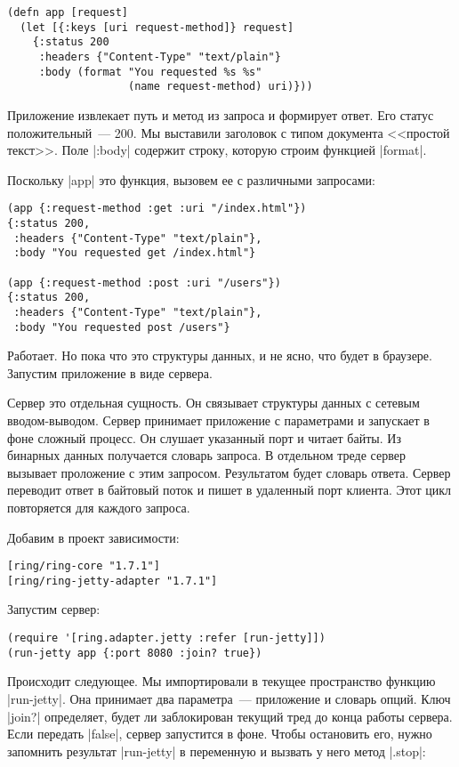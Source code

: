 \begin{verbatim}
(defn app [request]
  (let [{:keys [uri request-method]} request]
    {:status 200
     :headers {"Content-Type" "text/plain"}
     :body (format "You requested %s %s"
                   (name request-method) uri)}))
\end{verbatim}

Приложение извлекает путь и метод из запроса и формирует ответ. Его статус
положительный~--- 200. Мы выставили заголовок с типом документа <<простой
текст>>. Поле \spverb|:body| содержит строку, которую строим функцией \spverb|format|.

Поскольку \spverb|app| это функция, вызовем ее с различными запросами:

\begin{verbatim}
(app {:request-method :get :uri "/index.html"})
{:status 200,
 :headers {"Content-Type" "text/plain"},
 :body "You requested get /index.html"}

(app {:request-method :post :uri "/users"})
{:status 200,
 :headers {"Content-Type" "text/plain"},
 :body "You requested post /users"}
\end{verbatim}

Работает. Но пока что это структуры данных, и не ясно, что будет в
браузере. Запустим приложение в виде сервера.

Сервер это отдельная сущность. Он связывает структуры данных с сетевым
вводом-выводом. Сервер принимает приложение с параметрами и запускает в фоне
сложный процесс. Он слушает указанный порт и читает байты. Из бинарных
данных получается словарь запроса. В отдельном треде сервер вызывает проложение с
этим запросом. Результатом будет словарь ответа. Сервер переводит ответ в
байтовый поток и пишет в удаленный порт клиента. Этот цикл повторяется для
каждого запроса.

Добавим в проект зависимости:

\begin{verbatim}
[ring/ring-core "1.7.1"]
[ring/ring-jetty-adapter "1.7.1"]
\end{verbatim}

Запустим сервер:

\begin{verbatim}
(require '[ring.adapter.jetty :refer [run-jetty]])
(run-jetty app {:port 8080 :join? true})
\end{verbatim}

Происходит следующее. Мы импортировали в текущее пространство функцию
\spverb|run-jetty|. Она принимает два параметра~--- приложение и словарь
опций. Ключ \spverb|join?| определяет, будет ли заблокирован текущий тред до
конца работы сервера. Если передать \spverb|false|, сервер запустится в
фоне. Чтобы остановить его, нужно запомнить результат \spverb|run-jetty| в
переменную и вызвать у него метод \spverb|.stop|:

